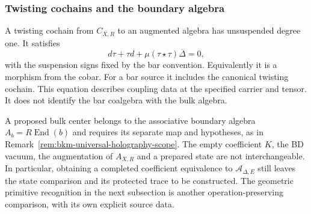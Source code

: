 \subsubsection*{Twisting cochains and the boundary algebra}

A twisting cochain from $C_{X,R}$ to an augmented algebra has
unsuspended degree one. It satisfies
\[
 d\tau+\tau d+\mu(\tau\star\tau)\overline\Delta=0,
\]
with the suspension signs fixed by the bar convention.
Equivalently it is a morphism from the cobar. For a bar source it
includes the canonical twisting cochain. This equation describes
coupling data at the specified carrier and tensor. It does not
identify the bar coalgebra with the bulk algebra.

A proposed bulk center belongs to the associative boundary algebra
$A_b=R\operatorname{End}(b)$ and requires its separate map and
hypotheses, as in Remark~\ref{rem:bkm-universal-holography-scope}.
The empty coefficient $K$, the BD vacuum, the augmentation of
$A_{X,R}$ and a prepared state are not interchangeable. In
particular, obtaining a completed coefficient equivalence to
$\mathcal A_{\Delta,E}$ still leaves the state comparison and its
protected trace to be constructed. The geometric primitive
recognition in the next subsection is another operation-preserving
comparison, with its own explicit source data.
